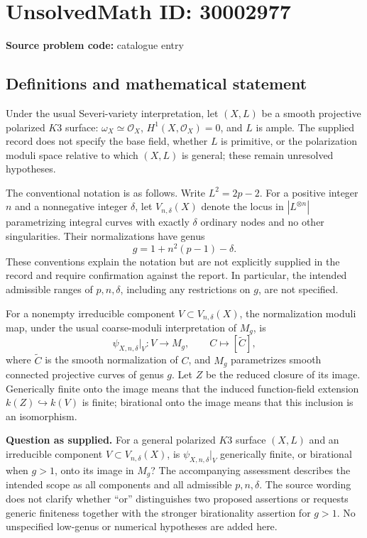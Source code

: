 \documentclass[11pt]{article}
\begin{document}
\section*{UnsolvedMath ID: 30002977}
\textbf{Source problem code:} catalogue entry
\subsection{Definitions and mathematical statement}
Under the usual Severi-variety interpretation, let \((X,L)\) be a smooth projective polarized \(K3\) surface: \(\omega_X\simeq\mathcal O_X\), \(H^1(X,\mathcal O_X)=0\), and \(L\) is ample. The supplied record does not specify the base field, whether \(L\) is primitive, or the polarization moduli space relative to which \((X,L)\) is general; these remain unresolved hypotheses.

The conventional notation is as follows. Write \(L^2=2p-2\). For a positive integer \(n\) and a nonnegative integer \(\delta\), let \(V_{n,\delta}(X)\) denote the locus in \(|L^{\otimes n}|\) parametrizing integral curves with exactly \(\delta\) ordinary nodes and no other singularities. Their normalizations have genus
\[
g=1+n^2(p-1)-\delta.
\]
These conventions explain the notation but are not explicitly supplied in the record and require confirmation against the report. In particular, the intended admissible ranges of \(p,n,\delta\), including any restrictions on \(g\), are not specified.

For a nonempty irreducible component \(V\subset V_{n,\delta}(X)\), the normalization moduli map, under the usual coarse-moduli interpretation of \(M_g\), is
\[
\psi_{X,n,\delta}|_V:V\longrightarrow M_g,
\qquad C\longmapsto[\widetilde C],
\]
where \(\widetilde C\) is the smooth normalization of \(C\), and \(M_g\) parametrizes smooth connected projective curves of genus \(g\). Let \(Z\) be the reduced closure of its image. Generically finite onto the image means that the induced function-field extension \(k(Z)\hookrightarrow k(V)\) is finite; birational onto the image means that this inclusion is an isomorphism.

\textbf{Question as supplied.} For a general polarized \(K3\) surface \((X,L)\) and an irreducible component \(V\subset V_{n,\delta}(X)\), is \(\psi_{X,n,\delta}|_V\) generically finite, or birational when \(g>1\), onto its image in \(M_g\)? The accompanying assessment describes the intended scope as all components and all admissible \(p,n,\delta\). The source wording does not clarify whether ``or'' distinguishes two proposed assertions or requests generic finiteness together with the stronger birationality assertion for \(g>1\). No unspecified low-genus or numerical hypotheses are added here.
\end{document}
